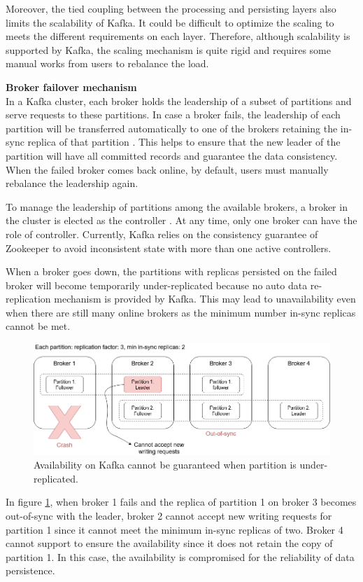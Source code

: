 Moreover, the tied coupling between the processing and persisting layers also limits the scalability of Kafka. It could be difficult to optimize the scaling to meets the different requirements on each layer. Therefore, although scalability is supported by Kafka, the scaling mechanism is quite rigid and requires some manual works from users to rebalance the load. 

\textbf{Broker failover mechanism}\\
In a Kafka cluster, each broker holds the leadership of a subset of partitions and serve requests to these partitions. In case a broker fails, the leadership of each partition will be transferred automatically to one of the brokers retaining the in-sync replica of that partition \cite{kafkadatareplication}. This helps to ensure that the new leader of the partition will have all committed records and guarantee the data consistency. When the failed broker comes back online, by default, users must manually rebalance the leadership again. 

To manage the leadership of partitions among the available brokers, a broker in the cluster is elected as the controller \cite{kafkaleaderelection}. At any time, only one broker can have the role of controller. Currently, Kafka relies on the consistency guarantee of Zookeeper to avoid inconsistent state with more than one active controllers. 

When a broker goes down, the partitions with replicas persisted on the failed broker will become temporarily under-replicated because no auto data re-replication mechanism is provided by Kafka. This may lead to unavailability even when there are still many online brokers as the minimum number in-sync replicas cannot be met. 

\begin{figure}[h]
	\centering
	\includegraphics[width=\linewidth]{images/broker-failover-kafka.png}
	\caption{Availability on Kafka cannot be guaranteed when partition is under-replicated.}
	\label{fig:brokerfailoverkafka}
\end{figure}
In figure \ref{fig:brokerfailoverkafka}, when broker 1 fails and the replica of partition 1 on broker 3 becomes out-of-sync with the leader, broker 2 cannot accept new writing requests for partition 1 since it cannot meet the minimum in-sync replicas of two. Broker 4 cannot support to ensure the availability since it does not retain the copy of partition 1. In this case, the availability is compromised for the reliability of data persistence.

